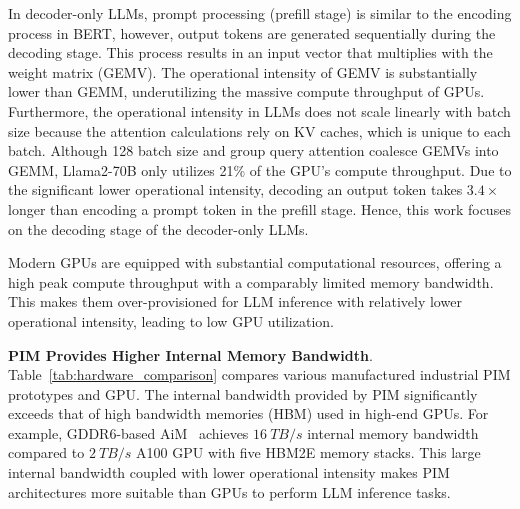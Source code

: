 In decoder-only LLMs, prompt processing (prefill stage) is similar to the encoding process in BERT, however, output tokens are generated sequentially during the decoding stage.
This process results in an input vector that multiplies with the weight matrix (GEMV).
The operational intensity of GEMV is substantially lower than GEMM, underutilizing the massive compute throughput of GPUs.
Furthermore, the operational intensity in LLMs does not scale linearly with batch size because the attention calculations rely on KV caches, which is unique to each batch.
Although 128 batch size and group query attention coalesce GEMVs into GEMM, Llama2-70B only utilizes \textcolor{myblue}{21\% of the GPU's compute throughput.}
\textcolor{myblue}{Due to the significant lower operational intensity, decoding an output token takes $3.4\times$ longer than encoding a prompt token in the prefill stage.
Hence, this work focuses on the decoding stage of the decoder-only LLMs.}



Modern GPUs are equipped with substantial computational resources, offering a high peak compute throughput with a comparably limited memory bandwidth. This makes them over-provisioned for LLM inference with relatively lower operational intensity, leading to low GPU utilization.


\textbf{PIM Provides Higher Internal Memory Bandwidth}. 
Table~\ref{tab:hardware_comparison} compares various manufactured industrial PIM prototypes and GPU. 
The internal bandwidth provided by PIM significantly exceeds that of high bandwidth memories (HBM) used in high-end GPUs. For example, GDDR6-based AiM~\cite{aim1, aim2} achieves $16~TB/s$ internal memory bandwidth compared to $2~TB/s$ A100 GPU with five HBM2E memory stacks. This large internal bandwidth coupled with lower operational intensity makes PIM architectures more suitable than GPUs to perform LLM inference tasks. 

